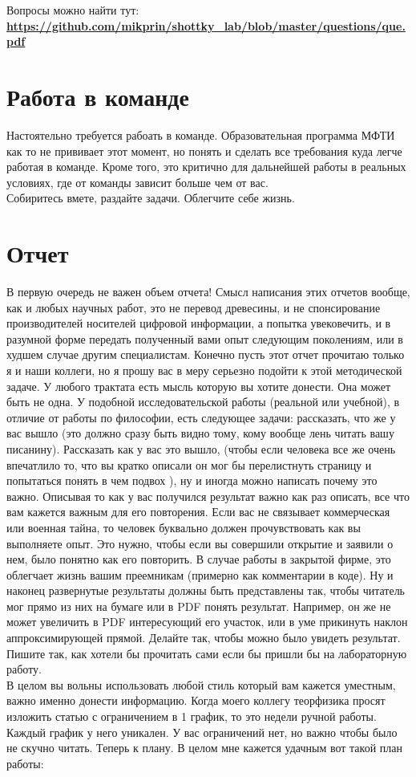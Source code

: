 \documentclass[a4paper,12pt]{article} %
\begin{document}
Вопросы можно найти тут: \textbf{\url{https://github.com/mikprin/shottky_lab/blob/master/questions/que.pdf}}


\section{Работа в команде}
Настоятельно требуется рабоать в команде. Образовательная программа МФТИ как то не прививает этот момент, но понять и сделать все требования куда легче работая в команде. Кроме того, это критично для дальнейшей работы в реальных условиях, где от команды зависит больше чем от вас.\\
Собиритесь вмете, раздайте задачи. Облегчите себе жизнь.


\section{Отчет}
В первую очередь не важен объем отчета! Смысл написания этих отчетов вообще, как и любых научных работ, это не перевод древесины, и не спонсирование производителей носителей цифровой информации, а попытка увековечить, и в разумной форме передать полученный вами опыт следующим поколениям, или в худшем случае другим специалистам. Конечно пусть этот отчет прочитаю только я и наши коллеги, но я прошу вас в меру серьезно подойти к этой методической задаче. У любого трактата есть мысль которую вы хотите донести. Она может быть не одна. У подобной исследовательской работы (реальной или учебной), в отличие от работы по философии, есть следующее задачи: рассказать, что же у вас вышло (это должно сразу быть видно тому, кому вообще лень читать вашу писанину). Рассказать как у вас это вышло,  (чтобы если человека все же очень впечатлило то, что вы кратко описали он мог бы перелистнуть страницу и попытаться понять в чем подвох ), ну и иногда можно написать почему это важно. Описывая то как у вас получился результат важно как раз описать, все что вам кажется важным для его повторения. Если вас не связывает коммерческая или военная тайна, то человек буквально должен прочувствовать как вы выполняете опыт. Это нужно, чтобы если вы совершили открытие и заявили о нем, было понятно как его повторить. В случае работы в закрытой фирме,  это облегчает жизнь вашим преемникам (примерно как комментарии в коде). Ну и наконец развернутые результаты должны быть представлены так, чтобы читатель мог прямо из них на бумаге или в PDF понять результат. Например, он же не может увеличить в PDF интересующий его участок, или в уме прикинуть наклон аппроксимирующей прямой. Делайте так, чтобы можно было увидеть результат. Пишите так, как хотели бы прочитать сами если бы пришли бы на лабораторную работу.\\
В целом вы вольны использовать любой стиль который вам кажется уместным, важно именно донести информацию. Когда моего коллегу теорфизика просят изложить статью с ограничением в 1 график, то это недели ручной работы. Каждый график у него уникален. У вас ограничений нет, но важно чтобы было не скучно читать. Теперь к плану.
В целом мне кажется удачным вот такой план работы:
\end{document}

